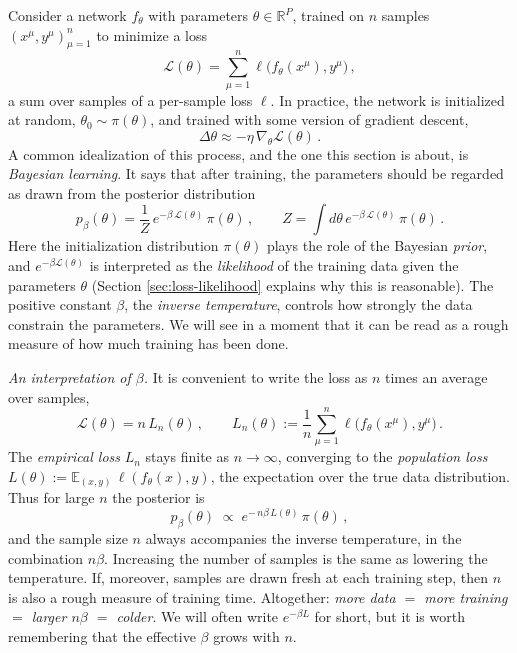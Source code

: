 \documentclass[11pt]{article}
\newcommand{\R}{\mathbb{R}}
\newcommand{\E}{\mathbb{E}}
\newcommand{\CL}{{\mathcal L}}
\begin{document}
Consider a network $f_\theta$ with parameters $\theta\in\R^P$, trained on $n$ samples $(x^\mu,y^\mu)_{\mu=1}^n$ to minimize a loss
%
\begin{equation}
    \CL(\theta) = \sum_{\mu=1}^n \ell\big(f_\theta(x^\mu),y^\mu\big)\,, \label{sec2-loss}
\end{equation}
%
a sum over samples of a per-sample loss $\ell$. In practice, the network is initialized at random, $\theta_0\sim\pi(\theta)$, and trained with some version of gradient descent,
%
\begin{equation}
    \Delta\theta \approx -\eta\,\nabla_\theta\CL(\theta)\,.
\end{equation}
%
A common idealization of this process, and the one this section is about, is \emph{Bayesian learning}. It says that after training, the parameters should be regarded as drawn from the posterior distribution
%
\begin{equation}
    p_\beta(\theta) = \frac{1}{Z}\,e^{-\beta\,\CL(\theta)}\,\pi(\theta)\,,\qquad Z = \int d\theta\, e^{-\beta\,\CL(\theta)}\,\pi(\theta)\,. \label{Bayes-P}
\end{equation}
%
Here the initialization distribution $\pi(\theta)$ plays the role of the Bayesian \emph{prior}, and $e^{-\beta\CL(\theta)}$ is interpreted as the \emph{likelihood} of the training data given the parameters $\theta$ (Section \ref{sec:loss-likelihood} explains why this is reasonable). The positive constant $\beta$, the \emph{inverse temperature}, controls how strongly the data constrain the parameters. We will see in a moment that it can be read as a rough measure of how much training has been done.

\emph{An interpretation of $\beta$.} It is convenient to write the loss as $n$ times an average over samples,
%
\begin{equation}
    \CL(\theta) = n\,L_n(\theta)\,,\qquad L_n(\theta) := \frac{1}{n}\sum_{\mu=1}^n\ell\big(f_\theta(x^\mu),y^\mu\big)\,.
\end{equation}
%
The \emph{empirical loss} $L_n$ stays finite as $n\to\infty$, converging to the \emph{population loss} $L(\theta) := \E_{(x,y)}\,\ell(f_\theta(x),y)$, the expectation over the true data distribution. Thus for large $n$ the posterior is
%
\begin{equation}
    p_\beta(\theta) \;\propto\; e^{-\,n\beta\,L(\theta)}\,\pi(\theta)\,, \label{Bayes-nbeta}
\end{equation}
%
and the sample size $n$ always accompanies the inverse temperature, in the combination $n\beta$. Increasing the number of samples is the same as lowering the temperature. If, moreover, samples are drawn fresh at each training step, then $n$ is also a rough measure of training time. Altogether: \emph{more data $=$ more training $=$ larger $n\beta$ $=$ colder}. We will often write $e^{-\beta L}$ for short, but it is worth remembering that the effective $\beta$ grows with $n$.
\end{document}
